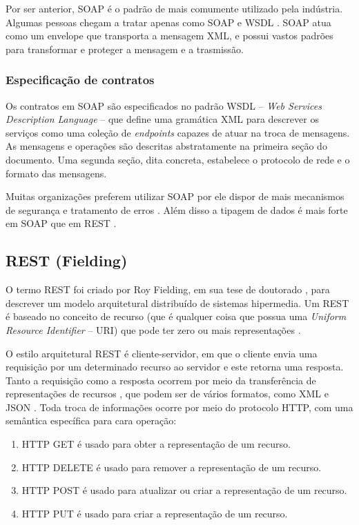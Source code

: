 Por ser anterior, SOAP é o padrão de \ws{} mais comumente utilizado pela
indústria.
Algumas pessoas chegam a tratar \ws{} apenas como SOAP e WSDL
\cite{serrano2014service}. SOAP atua como um envelope que transporta a mensagem
XML, e possui vastos padrões para transformar e proteger a mensagem e a
trasmissão. 


\subsubsection{Especificação de contratos}
\vspace{-6mm}

Os contratos em SOAP são especificados no padrão WSDL -- \textit{Web Services
Description Language} -- que define uma gramática XML para descrever os serviços
como uma coleção de \textit{endpoints} capazes de atuar na troca de mensagens.
As mensagens e operações são descritas abstratamente na primeira seção do
documento. Uma segunda seção, dita concreta, estabelece o protocolo de rede e o
formato das mensagens.

Muitas organizações preferem utilizar SOAP por ele dispor de mais mecanismos de
segurança e tratamento de erros \cite{serrano2014service}. Além disso a tipagem
de dados é mais forte em SOAP que em REST \cite{mumbaikar2013web}.


\subsection{REST (Fielding)}
\label{secaoREST}
\vspace{-6mm}

O termo REST foi criado por Roy Fielding, em sua tese de doutorado
\cite{fielding2000architectural}, para descrever um modelo arquitetural
distribuído de sistemas hipermedia. Um \ws{} REST é baseado no conceito de
recurso (que é qualquer coisa que possua uma \textit{Uniform Resource
Identifier} -- URI) que pode ter zero ou mais representações
\cite{he2003service}.

O estilo arquitetural REST é cliente-servidor, em que o cliente envia uma
requisição por um determinado recurso ao servidor e este retorna uma resposta.
Tanto a requisição como a resposta ocorrem por meio da transferência de
representações de recursos \cite{mumbaikar2013web}, que podem ser de vários
formatos, como XML e JSON \cite{serrano2014service}. Toda troca de informações
ocorre por meio do protocolo HTTP, com uma semântica específica para cara
operação:

\begin{enumerate}
\item HTTP GET é usado para obter a representação de um recurso.
\item HTTP DELETE é usado para remover a representação de um recurso.
\item HTTP POST é usado para atualizar ou criar a representação de um recurso.
\item HTTP PUT é usado para criar a representação de um recurso.
\end{enumerate}


